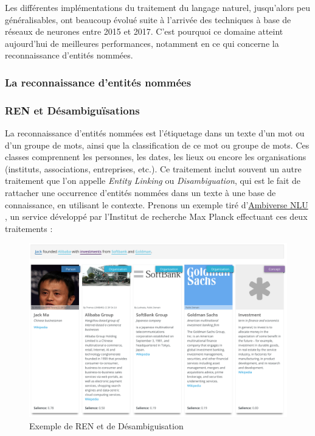 Les différentes implémentations du traitement du langage naturel, jusqu'alors peu généralisables, ont beaucoup évolué suite à l'arrivée des techniques à base de réseaux de neurones entre 2015 et 2017. C'est pourquoi ce domaine atteint aujourd'hui de meilleures performances, notamment en ce qui concerne la reconnaissance d'entités nommées.
\label{section 2.1.1}

\subsubsection{La reconnaissance d'entités nommées}

\subsubsection*{REN et Désambiguïsations}
La reconnaissance d'entités nommées est l'étiquetage dans un texte d'un mot ou d'un groupe de mots, ainsi que la classification de ce mot ou groupe de mots. Ces classes comprennent les personnes, les dates, les lieux ou encore les organisations (instituts, associations, entreprises, etc.). Ce traitement inclut souvent un autre traitement que l'on appelle \textit{Entity Linking} ou \textit{Disambiguation}, qui est le fait de rattacher une occurrence d'entités nommées dans un texte à une base de connaissance, en utilisant le contexte. Prenons un exemple tiré d'\href{https://ambiversenlu.mpi-inf.mpg.de/}{Ambiverse NLU} \cite{ambiverse-nlu}, un service développé par l'Institut de recherche Max Planck effectuant ces deux traitements :
\newline

\begin{figure}[H]
    \centering
    \includegraphics[scale=0.24]{images/ner-demo.png}
    \caption{Exemple de REN et de Désambiguisation}
    \label{fig:ner-demo}
\end{figure}

